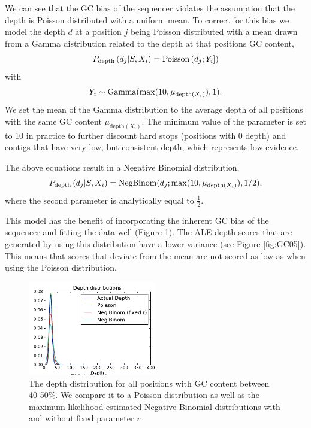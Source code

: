 \documentclass[phd,tocprelim]{cornell}
\begin{document}
We can see that the GC bias of the sequencer violates the assumption that the depth is Poisson distributed with a uniform mean. To correct for this bias we model the depth $d$ at a position $j$ being Poisson distributed with a mean drawn from a Gamma distribution related to the depth at that positions GC content,
\begin{equation}
    P_{\text{depth}}\left(d_{j}|S,X_{i}\right) = {\rm Poisson}\left(d_{j};Y_{i}]\right)
\end{equation}
with
\begin{equation}
    Y_{i} \sim {\rm Gamma}(\max(10,\mu_{\text{depth}(X_{i})}), 1).
\end{equation}
We set the mean of the Gamma distribution to the average depth of all positions with the same GC content $\mu_{\text{depth}(X_{i})}$. The minimum value of the parameter is set to 10 in practice to further discount hard stops (positions with 0 depth) and contigs that have very low, but consistent depth, which represents low evidence.

The above equations result in a Negative Binomial distribution,
\begin{equation}
    P_{\text{depth}}\left(d_{j}|S,X_{i}\right) = {\rm NegBinom}(d_{j}; \max(10, \mu_{\text{depth}(X_{i})}), 1/2),
\end{equation}
where the second parameter is analytically equal to $\frac{1}{2}$.

This model has the benefit of incorporating the inherent GC bias of the sequencer and fitting the data well (Figure \ref{fig:GC4}). The ALE depth scores that are generated by using this distribution have a lower variance (see Figure \ref{fig:GC05}). This means that scores that deviate from the mean are not scored as low as when using the Poisson distribution.

\begin{figure}[hptb]
    \centerline{\includegraphics[width=0.5\textwidth]{figures/ALE/GC_depth_distributions.png}}
    \caption[Various distributions fit to GC content]{The depth distribution for all positions with GC content between 40-50\%. We compare it to a Poisson distribution as well as the maximum likelihood estimated Negative Binomial distributions with and without fixed parameter $r$}\label{fig:GC4}
\end{figure}
\end{document}
